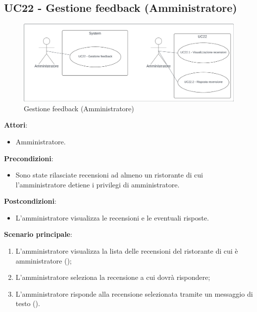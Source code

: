 \subsection{UC22 - Gestione feedback (Amministratore)}\label{usecase2:22}
\begin{figure}[H]
    \centering
    \includegraphics[width=0.9\linewidth]{ucd/ucd22.png}
    \caption{Gestione feedback (Amministratore)}
\end{figure}
\textbf{Attori}:
\begin{itemize}
    \item Amministratore.
\end{itemize}
\textbf{Precondizioni}:
\begin{itemize}
    \item Sono state rilasciate recensioni ad almeno un ristorante di cui l'amministratore detiene i privilegi di amministratore.
\end{itemize}
\textbf{Postcondizioni}:
\begin{itemize}
    \item L'amministratore visualizza le recensioni e le eventuali risposte.
\end{itemize}
\textbf{Scenario principale}:
\begin{enumerate}
    \item L'amministratore visualizza la lista delle recensioni del ristorante di cui è amministratore ();
    \item L'amministratore seleziona la recensione a cui dovrà rispondere;
    \item L'amministratore risponde alla recensione selezionata tramite un messaggio di testo ().
\end{enumerate}